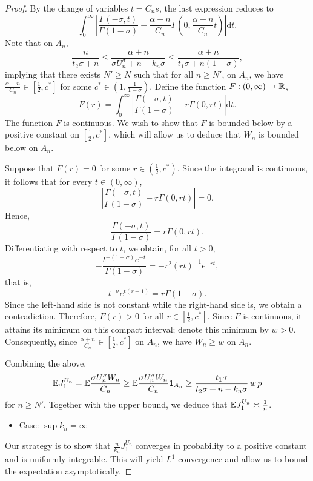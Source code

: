 \begin{proof}
    By the change of variables $t = C_ns$, the last expression reduces to
    \[
    \int_0^\infty \left| \frac{\Gamma(-\sigma, t)}{\Gamma(1-\sigma)}- \frac{\alpha + n}{C_n}\Gamma\left( 0, \frac{\alpha + n}{C_n}t\right)\right|\mathrm{d}t.
    \]
    Note that on $A_n$,
    \[
    \frac{n}{t_2\sigma + n}\leq \frac{\alpha + n}{\sigma U_n^\sigma + n - k_n \sigma} \leq \frac{\alpha + n}{t_1 \sigma + n(1-\sigma)},
    \]
    implying that there exists $N' \geq N$ such that for all $n \geq N'$, on $A_n$, we have $\frac{\alpha + n}{C_n} \in \left[\frac{1}{2},c^*\right]$ for some $c^* \in \left(1,\frac{1}{1-\sigma}\right)$.
    Define the function $F : (0,\infty) \to \mathbb{R}$,
    \[
    F(r) = \int_0^\infty \left| \frac{\Gamma(-\sigma, t)}{\Gamma(1-\sigma)}- r\Gamma\left( 0, rt\right)\right|\mathrm{d}t.
    \]
    The function $F$ is continuous. We wish to show that $F$ is bounded below by a positive constant on $\left[\frac{1}{2},c^*\right]$, which will allow us to deduce that $W_n$ is bounded below on $A_n$.

    Suppose that $F(r) = 0$ for some $r \in \left(\frac{1}{2}, c^*\right)$. Since the integrand is continuous, it follows that for every $t \in (0,\infty)$,
    \[
    \left| \frac{\Gamma(-\sigma, t)}{\Gamma(1-\sigma)}- r\Gamma\left( 0, rt\right)\right| = 0.
    \]
    Hence,
    \[
    \frac{\Gamma(-\sigma, t)}{\Gamma(1-\sigma)} = r \Gamma(0, rt).
    \]
    Differentiating with respect to $t$, we obtain, for all $t > 0$,
    \[
    -\frac{t^{-(1+\sigma)}e^{-t}}{\Gamma(1-\sigma)} = -r^2 (rt)^{-1}e^{-rt},
    \]
    that is,
    \[
    t^{-\sigma}e^{t(r-1)} = r\Gamma(1-\sigma).
    \]
    Since the left-hand side is not constant while the right-hand side is, we obtain a contradiction. Therefore, $F(r) > 0$ for all $r \in \left[\frac{1}{2},c^*\right]$. Since $F$ is continuous, it attains its minimum on this compact interval; denote this minimum by $w > 0$. Consequently, since $\frac{\alpha + n}{C_n} \in \left[\frac{1}{2},c^*\right]$ on $A_n$, we have $W_n \geq w$ on $A_n$.

    Combining the above,
    \[
    \mathbb{E} J_1^{U_n} = \mathbb{E} \frac{\sigma U_n^\sigma W_n}{C_n} \geq \mathbb{E} \frac{\sigma U_n^\sigma W_n}{C_n}\mathbf{1}_{A_n} \geq \frac{t_1 \sigma}{t_2 \sigma + n-k_n\sigma}\,w\,p
    \]
    for $n \geq N'$. Together with the upper bound, we deduce that $\mathbb{E} J_1^{U_n} \asymp \frac{1}{n}$.

    \begin{itemize}
        \item Case: $\sup k_n = \infty$
    \end{itemize}
    Our strategy is to show that $\frac{n}{k_n}J_1^{U_n}$ converges in probability to a positive constant and is uniformly integrable. This will yield $L^1$ convergence and allow us to bound the expectation asymptotically.


\end{proof}

